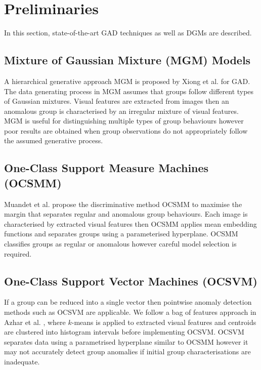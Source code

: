 \section{Preliminaries} \label{sec:preliminaries}
In this section, state-of-the-art GAD techniques  as well as DGMs are described.  

\subsection{Mixture of Gaussian Mixture (MGM) Models  }
\label{sec:mgmm} 

A hierarchical generative approach MGM is proposed by Xiong et al. \cite{MGM} for GAD. The data generating process in MGM  assumes that groups follow different types of Gaussian mixtures. %
 Visual features are extracted from images then an anomalous group is characterised by an irregular mixture of visual features.  MGM is useful for distinguishing multiple types of group behaviours however poor results are obtained when group observations do  not appropriately follow the assumed generative process.

\subsection{One-Class Support Measure Machines (OCSMM)}
\label{sec:ocsmm}
 Muandet et al. \cite{OCSMM} propose the discriminative method OCSMM to maximise the margin that separates regular and anomalous group behaviours.    Each image is characterised by extracted visual features then OCSMM applies mean embedding functions and separates groups using a parameterised hyperplane.  OCSMM classifies groups as regular or anomalous however careful model  selection is required.   

\subsection{One-Class Support Vector Machines (OCSVM) }
\label{sec:ocsvm}
 If a group can be  reduced into a  single vector then pointwise anomaly detection methods such as OCSVM %
  \cite{OCSVM} are applicable.    We follow a bag of features approach in Azhar et al. \cite{SIFT-OCSVM}, where $k$-means is applied to extracted visual features and centroids are clustered into histogram intervals before implementing OCSVM.  OCSVM separates data using a parametrised hyperplane similar to OCSMM however it may not accurately detect group anomalies if  initial group characterisations are inadequate.  


